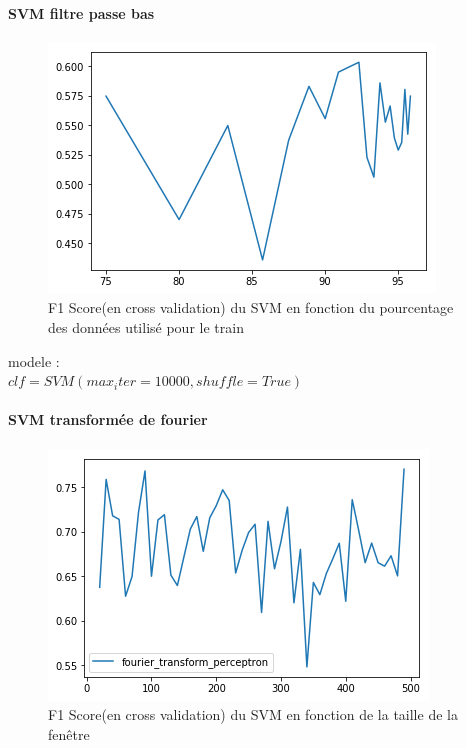 \documentclass{article}
\begin{document}
\paragraph{SVM filtre passe bas }
\begin{figure}[H]
\begin{center}
\includegraphics[scale=0.7]{images/perceptron_passe_bas_f1Score.png}
\end{center}
\caption{F1 Score(en cross validation) du SVM en fonction du pourcentage des données utilisé pour le train}
\end{figure}
modele :\\
$
 clf = SVM(max_iter=10000,shuffle=True)    
$


\paragraph{SVM transformée de fourier }
\begin{figure}[H]
\begin{center}
\includegraphics[scale=0.7]{images/perceptron_tf_f1Score.png}
\end{center}
\caption{F1 Score(en cross validation) du SVM en fonction de la taille de la fenêtre}
\end{figure}
\end{document}

